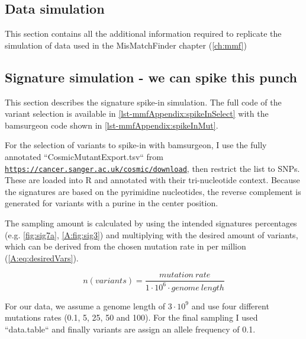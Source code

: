 \subsection{Data simulation}
\label{ch-mmfAppendix:simulation}
This section contains all the additional information required to replicate the simulation of data used in the MisMatchFinder chapter (\autoref{ch:mmf})

\subsection{Signature simulation - we can spike this punch}
\label{ch-mmfAppendix:spikein}
This section describes the signature spike-in simulation. The full code of the variant selection is available in \autoref{lst-mmfAppendix:spikeInSelect} with the bamsurgeon code shown in \autoref{lst-mmfAppendix:spikeInMut}.

For the selection of variants to spike-in with bamsurgeon, I use the fully annotated ``CosmicMutantExport.tsv`` from \href{https://cancer.sanger.ac.uk/cosmic/download}{\nolinkurl{https://cancer.sanger.ac.uk/cosmic/download}}, then restrict the list to SNPs. These are loaded into R and annotated with their tri-nucleotide context. Because the signatures are based on the pyrimidine nucleotides, the reverse complement is generated for variants with a purine in the center position.

The sampling amount is calculated by using the intended signatures percentages (e.g. \autoref{fig:sig7a}, \autoref{A:fig:sig3}) and multiplying with the desired amount of variants, which can be derived from the chosen mutation rate in per million (\autoref{A:eq:desiredVars}).

\begin{equation}
n(variants) = \frac{mutation~rate}{1\cdot10^{6} \cdot genome~length}
\label{A:eq:desiredVars}
\end{equation}

For our data, we assume a genome length of $3 \cdot 10^9$ and use four different mutations rates (0.1, 5, 25, 50 and 100). For the final sampling I used ``data.table`` and finally variants are assign an allele frequency of 0.1.


